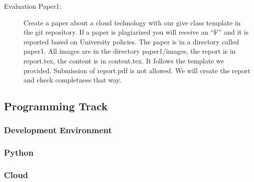 \begin{description}
\item[Evaluation Paper1:] Create a paper about a cloud technology with
  our give class template in the git repository. If a paper is
  plagiarized you will receive an ``F'' and it is reported based on
  University policies. The paper is in a directory called paper1. All
  images are in the directory paper1/images, the report is in
  report.tex, the content is in content.tex. It follows the template
  we provided. Submission of report.pdf is not allowed. We will create
  the report and check completness that way.
\end{description}

\subsection{Programming Track}

\subsubsection{Development Environment}


\begin{comment}
\begin{description}
\item[Evaluation Experiment 1:] Create a virtual machine and take a
  photo with your laptop or computer and the virtual box running on
  the screen. Showcase the virtual box interface and in non full
  screen mode at the same time the operating system you run. We
  recommend yo use Ubuntu.
\end{description}
\end{comment}


\subsubsection{Python}


\subsubsection{Cloud}

